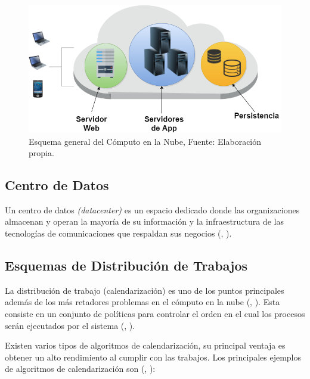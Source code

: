 \setcounter{figure}{1}
\renewcommand\thefigure{\arabic{figure}}
\begin{figure}
	\centering
	\includegraphics[scale=0.5]{media/cloud1}
	\caption{Esquema general del C\'omputo en la Nube, Fuente: Elaboraci\'on propia.}
\end{figure}


\subsection*{Centro de Datos}
Un centro de datos \textit{(datacenter)} es un espacio dedicado donde las organizaciones almacenan y operan la mayor\'ia de su informaci\'on y la infraestructura de las tecnolog\'ias de comunicaciones que respaldan sus negocios (\citeauthor{whatisdatacenter}, \citeyear{whatisdatacenter}).

\subsection*{Esquemas de Distribuci\'on de Trabajos}

La distribuci\'on de trabajo (calendarizaci\'on) es uno de los puntos principales adem\'as de los m\'as retadores problemas en el c\'omputo en la nube (\citeauthor{li2014greedy}, \citeyear{li2014greedy}). Esta consiste en un conjunto de pol\'iticas para controlar el orden en el cual los procesos ser\'an ejecutados por el sistema (\citeauthor{agarwal2014efficient}, \citeyear{agarwal2014efficient}).

Existen varios tipos de algoritmos de calendarizaci\'on, su principal ventaja es obtener un alto rendimiento al cumplir con las trabajos. Los principales ejemplos de algoritmos de calendarizaci\'on son (\citeauthor{salot2013survey}, \citeyear{salot2013survey}):

